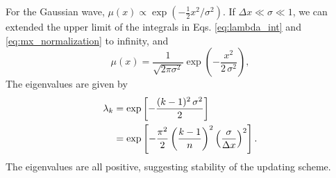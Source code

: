 \documentclass[reprint]{revtex4-1}
\begin{document}
For the Gaussian wave,
$\mu(x) \propto \exp(-\frac{1}{2} x^2/\sigma^2)$.
%
If $\Delta x \ll \sigma \ll 1$,
we can extended
the upper limit of the integrals
in Eqs. \eqref{eq:lambda_int}
and \eqref{eq:mx_normalization}
to infinity, and
%
\begin{equation}
\mu(x)
=
\frac{            1            }
     { \sqrt{ 2 \pi \sigma^2 } }
%
\exp\left(
      -\frac{       x^2     }
            { 2 \, \sigma^2 }
    \right),
\end{equation}
%
%
The eigenvalues are given by
%
\begin{align}
\lambda_k
&=
\exp\left[
      -\frac{ (k - 1)^2 \, \sigma^2 }
            {           2           }
    \right]
\notag
\\
&=
\exp\left[
      -\frac{ \pi^2 }{ 2 }
      \left(
        \frac{ k - 1 }
             {   n   }
      \right)^2
      \left(
        \frac{  \sigma }
             { \Delta x }
      \right)^2
    \right]
.
\label{eq:lambda_Gaussian}
\end{align}
%
The eigenvalues are all positive,
suggesting stability of the updating scheme.


\end{document}
